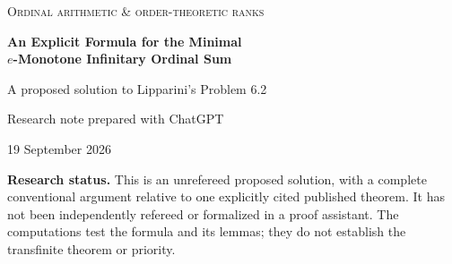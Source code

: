 \documentclass[11pt,a4paper]{article}
\theoremstyle{definition}
\newcommand{\tail}{\varepsilon}
\begin{document}
\hypersetup{pageanchor=false}
\begin{titlepage}
\vspace*{10mm}
{\color{Accent}\large\textsc{Ordinal arithmetic \& order-theoretic ranks}\par}
\vspace{9mm}
{\color{Ink}\LARGE\bfseries An Explicit Formula for the Minimal\\[3pt]
\boldmath$e$-Monotone Infinitary Ordinal Sum\par}
\vspace{6mm}
{\large A proposed solution to Lipparini's Problem 6.2\par}
\vspace{9mm}
{Research note prepared with ChatGPT\par}
{19 September 2026\par}
\vspace{11mm}
\begin{abstract}
For a countable sequence of ordinals $x=(\alpha_i)_{i<\omega}$, let
$\tail(x)$ be the least threshold at or above which only finitely many entries
occur. Consider the least ordinal-valued operation that is weakly monotone
coordinatewise and strictly increases whenever an increased coordinate reaches
$\tail(x)$. We give a three-case, finite Cantor-normal-form formula for this
operation. It depends only on the threshold and the finite multiset of
exceptional entries at or above it.

The proof separates an arithmetic upper bound from a rank-theoretic lower
bound. The key upper-bound lemma controls changes of threshold; the lower
bound uses a published minimality theorem for Lipparini's weaker operation,
together with finite-product ranks. We also identify the operation as the
rank of countable ordinal multisets under injective domination. Its difference
from the weaker operation is classified exactly: a finite increment, a natural
summand $\omega$, or zero. Consequences include the height of the domination
poset on countable multisets with bounded entries and an exact finite-cap
analogue. A second proof uses corrected blocks and finite-part restoration instead of
finite-product ranks. Two independent Python implementations and their
separately recorded symbolic and finite-poset audits accompany the article.
\end{abstract}
\vfill
\begin{resultbox}
\textbf{Research status.} This is an unrefereed proposed solution, with a complete
conventional argument relative to one explicitly cited published theorem.
It has not been independently refereed or formalized in a proof assistant.
The computations test the formula and its lemmas; they do not establish the
transfinite theorem or priority.
\end{resultbox}
\end{titlepage}\hypersetup{pageanchor=true}
\end{document}
